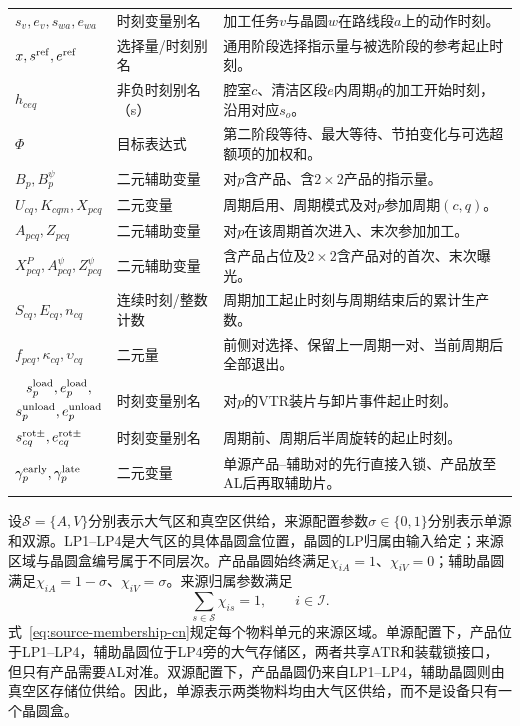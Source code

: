 \documentclass[final,5p,times,twocolumn]{elsarticle}
\begin{document}
\begin{table}[t]
\begin{tabular}{C{0.20\textwidth}C{0.16\textwidth}C{0.43\textwidth}}
$s_v,e_v,s_{wa},e_{wa}$ & 时刻变量别名 & 加工任务$v$与晶圆$w$在路线段$a$上的动作时刻。\\
$x,s^{\rm ref},e^{\rm ref}$ & 选择量/时刻别名 & 通用阶段选择指示量与被选阶段的参考起止时刻。\\
$h_{ceq}$ & 非负时刻别名（s） & 腔室$c$、清洁区段$e$内周期$q$的加工开始时刻，沿用对应$s_o$。\\
$\Phi$ & 目标表达式 & 第二阶段等待、最大等待、节拍变化与可选超额项的加权和。\\
$B_p,B_p^{\psi}$ & 二元辅助变量 & 对$p$含产品、含$2\times2$产品的指示量。\\
$U_{cq},K_{cqm},X_{pcq}$ & 二元变量 & 周期启用、周期模式及对$p$参加周期$(c,q)$。\\
$A_{pcq},Z_{pcq}$ & 二元辅助变量 & 对$p$在该周期首次进入、末次参加加工。\\
$X^P_{pcq},A^{\psi}_{pcq},Z^{\psi}_{pcq}$ & 二元辅助变量 & 含产品占位及$2\times2$含产品对的首次、末次曝光。\\
$S_{cq},E_{cq},n_{cq}$ & 连续时刻/整数计数 & 周期加工起止时刻与周期结束后的累计生产数。\\
$f_{pcq},\kappa_{cq},\upsilon_{cq}$ & 二元量 & 前侧对选择、保留上一周期一对、当前周期后全部退出。\\
$\begin{gathered}s^{\rm load}_p,e^{\rm load}_p,\\s^{\rm unload}_p,e^{\rm unload}_p\end{gathered}$ & 时刻变量别名 & 对$p$的VTR装片与卸片事件起止时刻。\\
$s^{\rm rot\pm}_{cq},e^{\rm rot\pm}_{cq}$ & 时刻变量别名 & 周期前、周期后半周旋转的起止时刻。\\
$\gamma^{\rm early}_p,\gamma^{\rm late}_p$ & 二元变量 & 单源产品--辅助对的先行直接入锁、产品放至AL后再取辅助片。\\
\bottomrule
\end{tabular}
\end{table}

设$\mathcal S=\{A,V\}$分别表示大气区和真空区供给，来源配置参数$\sigma\in\{0,1\}$分别表示单源和双源。LP1--LP4是大气区的具体晶圆盒位置，晶圆的LP归属由输入给定；来源区域与晶圆盒编号属于不同层次。产品晶圆始终满足$\chi_{iA}=1$、$\chi_{iV}=0$；辅助晶圆满足$\chi_{iA}=1-\sigma$、$\chi_{iV}=\sigma$。来源归属参数满足
\begin{equation}
\sum_{s\in\mathcal S}\chi_{is}=1,
\qquad i\in\mathcal I.
\label{eq:source-membership-cn}
\end{equation}
式~\eqref{eq:source-membership-cn}规定每个物料单元的来源区域。单源配置下，产品位于LP1--LP4，辅助晶圆位于LP4旁的大气存储区，两者共享ATR和装载锁接口，但只有产品需要AL对准。双源配置下，产品晶圆仍来自LP1--LP4，辅助晶圆则由真空区存储位供给。因此，单源表示两类物料均由大气区供给，而不是设备只有一个晶圆盒。
\end{document}
